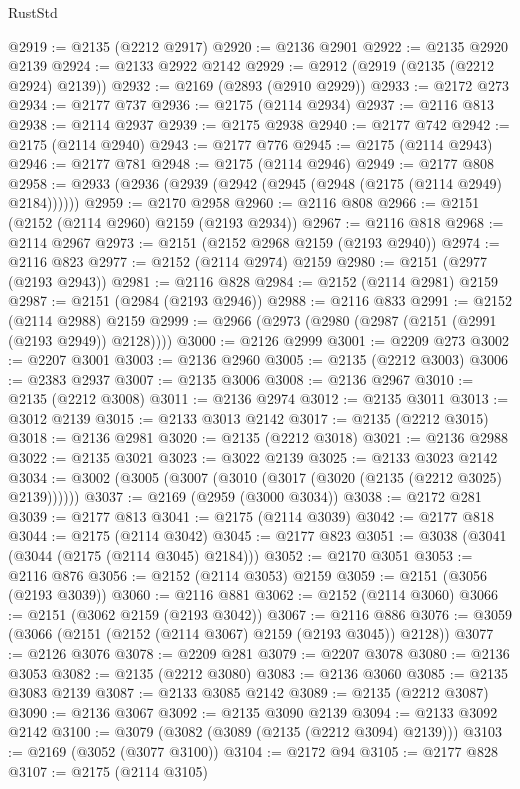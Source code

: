 \begin{lexlean}{RustStd}
\begin{coremodule}
{\begin{coremodule}
{{{{{{{{{{{{{{{{@2919 := @2135 (@2212 @2917)
@2920 := @2136 @2901
@2922 := @2135 @2920 @2139
@2924 := @2133 @2922 @2142
@2929 := @2912 (@2919 (@2135 (@2212 @2924) @2139))
@2932 := @2169 (@2893 (@2910 @2929))
@2933 := @2172 @273
@2934 := @2177 @737
@2936 := @2175 (@2114 @2934)
@2937 := @2116 @813
@2938 := @2114 @2937
@2939 := @2175 @2938
@2940 := @2177 @742
@2942 := @2175 (@2114 @2940)
@2943 := @2177 @776
@2945 := @2175 (@2114 @2943)
@2946 := @2177 @781
@2948 := @2175 (@2114 @2946)
@2949 := @2177 @808
@2958 := @2933 (@2936 (@2939 (@2942 (@2945 (@2948 (@2175 (@2114 @2949) @2184))))))
@2959 := @2170 @2958
@2960 := @2116 @808
@2966 := @2151 (@2152 (@2114 @2960) @2159 (@2193 @2934))
@2967 := @2116 @818
@2968 := @2114 @2967
@2973 := @2151 (@2152 @2968 @2159 (@2193 @2940))
@2974 := @2116 @823
@2977 := @2152 (@2114 @2974) @2159
@2980 := @2151 (@2977 (@2193 @2943))
@2981 := @2116 @828
@2984 := @2152 (@2114 @2981) @2159
@2987 := @2151 (@2984 (@2193 @2946))
@2988 := @2116 @833
@2991 := @2152 (@2114 @2988) @2159
@2999 := @2966 (@2973 (@2980 (@2987 (@2151 (@2991 (@2193 @2949)) @2128))))
@3000 := @2126 @2999
@3001 := @2209 @273
@3002 := @2207 @3001
@3003 := @2136 @2960
@3005 := @2135 (@2212 @3003)
@3006 := @2383 @2937
@3007 := @2135 @3006
@3008 := @2136 @2967
@3010 := @2135 (@2212 @3008)
@3011 := @2136 @2974
@3012 := @2135 @3011
@3013 := @3012 @2139
@3015 := @2133 @3013 @2142
@3017 := @2135 (@2212 @3015)
@3018 := @2136 @2981
@3020 := @2135 (@2212 @3018)
@3021 := @2136 @2988
@3022 := @2135 @3021
@3023 := @3022 @2139
@3025 := @2133 @3023 @2142
@3034 := @3002 (@3005 (@3007 (@3010 (@3017 (@3020 (@2135 (@2212 @3025) @2139))))))
@3037 := @2169 (@2959 (@3000 @3034))
@3038 := @2172 @281
@3039 := @2177 @813
@3041 := @2175 (@2114 @3039)
@3042 := @2177 @818
@3044 := @2175 (@2114 @3042)
@3045 := @2177 @823
@3051 := @3038 (@3041 (@3044 (@2175 (@2114 @3045) @2184)))
@3052 := @2170 @3051
@3053 := @2116 @876
@3056 := @2152 (@2114 @3053) @2159
@3059 := @2151 (@3056 (@2193 @3039))
@3060 := @2116 @881
@3062 := @2152 (@2114 @3060)
@3066 := @2151 (@3062 @2159 (@2193 @3042))
@3067 := @2116 @886
@3076 := @3059 (@3066 (@2151 (@2152 (@2114 @3067) @2159 (@2193 @3045)) @2128))
@3077 := @2126 @3076
@3078 := @2209 @281
@3079 := @2207 @3078
@3080 := @2136 @3053
@3082 := @2135 (@2212 @3080)
@3083 := @2136 @3060
@3085 := @2135 @3083 @2139
@3087 := @2133 @3085 @2142
@3089 := @2135 (@2212 @3087)
@3090 := @2136 @3067
@3092 := @2135 @3090 @2139
@3094 := @2133 @3092 @2142
@3100 := @3079 (@3082 (@3089 (@2135 (@2212 @3094) @2139)))
@3103 := @2169 (@3052 (@3077 @3100))
@3104 := @2172 @94
@3105 := @2177 @828
@3107 := @2175 (@2114 @3105)
}}}}}}}}}}}}}}}}
\end{coremodule}}
\end{coremodule}
\end{lexlean}

